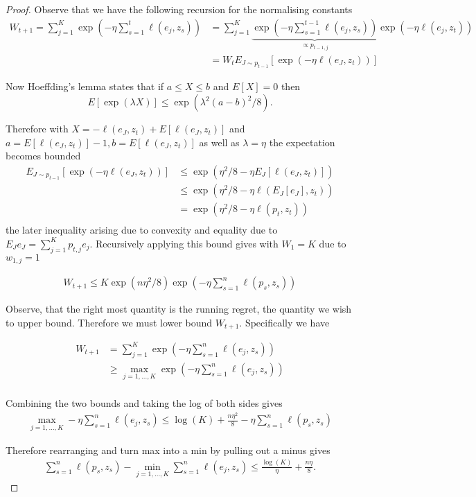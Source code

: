 \begin{proof}
Observe that we have the following recursion for the normalising constants
\begin{align*}
	W_{t+1} =
	\sum_{j=1}^K \exp
	\left(
	-\eta \sum_{s=1}^{t}\ell(e_j,z_s)
	\right) & =
	\sum_{j=1}^K 	\underbrace{ \exp
	\left(
	-\eta \sum_{s=1}^{t-1}\ell(e_j,z_s)
	\right)
	}_{
	\propto p_{t-1,j}
	}
	\exp\left(-\eta \ell(e_j,z_t)\right)\\
	& = W_{t}E_{J \sim p_{t-1}}\left[
		\exp\left(-\eta \ell(e_J,z_t)\right)
	\right]
\end{align*}

Now Hoeffding’s lemma states that if $a \leq X \leq b$  and $E[X] = 0$ then
$$
	E[\exp(\lambda X )] \leq \exp(\lambda^2 ( a - b)^2 /8).
$$

Therefore with $X = - \ell(e_J,z_t) + E[\ell(e_J,z_t)]$ and $a = E[\ell(e_J,z_t)] - 1, b =  E[\ell(e_J,z_t)]$ as well as $\lambda = \eta$ the expectation becomes bounded
\begin{align*}
	E_{J \sim p_{t-1}}\left[\exp\left(-\eta \ell(e_J,z_t)\right)\right]
	&\leq \exp\left( \eta^2/8 - \eta E_{J}[\ell(e_J,z_t)]\right) \\
	&\leq \exp\left( \eta^2/8 - \eta \ell(E_{J}[e_J],z_t)\right) \\
	& = \exp\left( \eta^2/8 - \eta \ell(p_t,z_t)\right) \\
\end{align*}
the later inequality arising due to convexity and equality due to $E_Je_J = \sum_{j=1}^K p_{t,j}e_j$. Recursively applying this bound gives with $W_1 = K$ due to $w_{1,j} = 1$

\begin{align*}
W_{t+1} \leq K \exp(n \eta^2/8) \exp\left( - \eta \sum_{s=1}^{n} \ell(p_s,z_s)\right)
\end{align*}

Observe, that the right most quantity is the running regret, the quantity we wish to upper bound. Therefore we must lower bound $W_{t+1}$. Specifically we have

\begin{align*}
	W_{t+1} & = \sum_{j=1}^K \exp\left( - \eta \sum_{s=1}^n\ell(e_j,z_s)\right) \\
	& \geq  \max_{j =1,\dots,K} \exp\left( - \eta \sum_{s=1}^n\ell(e_j,z_s)\right)\\
\end{align*}

Combining the two bounds and taking the log of both sides gives
\begin{align*}
\max_{j =1,\dots,K} - \eta \sum_{s=1}^n\ell(e_j,z_s)  \leq \log(K) +
\frac{n \eta^2}{8} - \eta \sum_{s=1}^{n} \ell(p_s,z_s)
\end{align*}


Therefore rearranging and turn max into a min by pulling out a minus gives
\begin{align*}
\sum_{s=1}^{n} \ell(p_s,z_s)   - \min_{j =1,\dots,K} \sum_{s=1}^n \ell(e_j,z_s) \leq \frac{\log(K)}{\eta} + \frac{n \eta}{8}.
\end{align*}

\end{proof}

